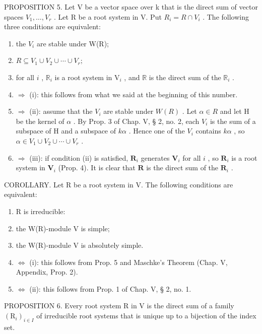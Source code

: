 PROPOSITION 5. Let V be a vector space over k that is the direct sum of vector spaces \(V_{1}, \ldots, V_{r}\) . Let R be a root system in V. Put \(R_{i} = R \cap V_{i}\) . The following three conditions are equivalent:

\begin{enumerate}
\def\labelenumi{(\roman{enumi})}
\item
  the \(V_{i}\) are stable under W(R);
\item
  \(R \subseteq V_{1} \cup V_{2} \cup \cdots \cup V_{r};\)
\item
  for all \(i\) , \(\mathbb{R}_i\) is a root system in \(\mathrm{V}_i\) , and \(\mathbb{R}\) is the direct sum of the \(\mathbb{R}_i\) .
\item
  \(\Longrightarrow\) (i): this follows from what we said at the beginning of this number.
\item
  \(\Longrightarrow\) (ii): assume that the \(V_{i}\) are stable under \(W(R)\) . Let \(\alpha \in R\) and let H be the kernel of \(\alpha\) . By Prop. 3 of Chap. V, § 2, no. 2, each \(V_{i}\) is the sum of a subspace of H and a subspace of \(k\alpha\) . Hence one of the \(V_{i}\) contains \(k\alpha\) , so \(\alpha \in V_{1} \cup V_{2} \cup \cdots \cup V_{r}\) .
\item
  \(\Longrightarrow\) (iii): if condition (ii) is satisfied, \(\mathbf{R}_i\) generates \(\mathbf{V}_i\) for all \(i\) , so \(\mathbf{R}_i\) is a root system in \(\mathbf{V}_i\) (Prop. 4). It is clear that \(\mathbf{R}\) is the direct sum of the \(\mathbf{R}_i\) .
\end{enumerate}

COROLLARY. Let R be a root system in V. The following conditions are equivalent:

\begin{enumerate}
\def\labelenumi{(\roman{enumi})}
\item
  R is irreducible:
\item
  the W(R)-module V is simple;
\item
  the W(R)-module V is absolutely simple.
\item
  \(\Longleftrightarrow\) (i): this follows from Prop. 5 and Maschke's Theorem (Chap. V, Appendix, Prop. 2).
\item
  \(\Longleftrightarrow\) (ii): this follows from Prop. 1 of Chap. V, § 2, no. 1.
\end{enumerate}

PROPOSITION 6. Every root system R in V is the direct sum of a family \((\mathrm{R}_{i})_{i\in I}\) of irreducible root systems that is unique up to a bijection of the index set.

